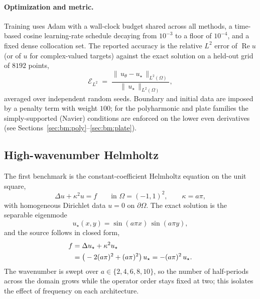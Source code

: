 \paragraph{Optimization and metric.}
Training uses Adam with a wall-clock budget shared across all methods, a
time-based cosine learning-rate schedule decaying from \(10^{-3}\) to a floor of
\(10^{-4}\), and a fixed dense collocation set. The reported accuracy is the
relative \(L^2\) error of \(\operatorname{Re} u\) (or of \(u\) for complex-valued
targets) against the exact solution on a held-out grid of \(8192\) points,
\begin{equation}\label{eq:relL2}
  \mathcal{E}_{L^2}
  \;=\;
  \frac{\big\|\,u_\theta - u_\star\,\big\|_{L^2(\Omega)}}
       {\big\|\,u_\star\,\big\|_{L^2(\Omega)}} ,
\end{equation}
averaged over independent random seeds. Boundary and initial data are imposed by
a penalty term with weight \(100\); for the polyharmonic and plate families the
simply-supported (Navier) conditions are enforced on the lower even derivatives
(see Sections~\ref{sec:bm:poly}--\ref{sec:bm:plate}).

\subsection{High-wavenumber Helmholtz}\label{sec:bm:helmholtz}

The first benchmark is the constant-coefficient Helmholtz equation on the unit
square,
\begin{equation}\label{eq:helm_pde}
  \Delta u + \kappa^2 u = f
  \qquad \text{in } \Omega = (-1,1)^2,
  \qquad \kappa = a\pi,
\end{equation}
with homogeneous Dirichlet data \(u = 0\) on \(\partial\Omega\). The exact
solution is the separable eigenmode
\begin{equation}\label{eq:helm_sol}
  u_\star(x,y) = \sin(a\pi x)\,\sin(a\pi y),
\end{equation}
and the source follows in closed form,
\begin{align}\label{eq:helm_source}
  f
  &= \Delta u_\star + \kappa^2 u_\star \notag\\
  &= \big(-2(a\pi)^2 + (a\pi)^2\big)\,u_\star
   = -(a\pi)^2\,u_\star .
\end{align}
The wavenumber is swept over \(a \in \{2,4,6,8,10\}\), so the number of
half-periods across the domain grows while the operator order stays fixed at
two; this isolates the effect of frequency on each architecture.

